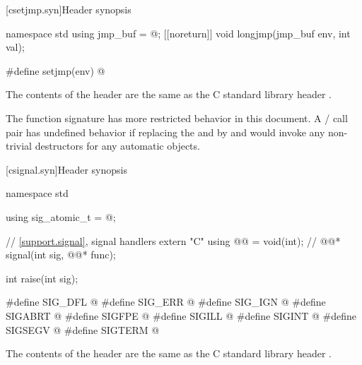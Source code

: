 
[csetjmp.syn]{Header  synopsis}

%
%
%
%
\begin{codeblock}
namespace std {
  using jmp_buf = @\seebelow@;
  [[noreturn]] void longjmp(jmp_buf env, int val);
}

#define setjmp(env) @\seebelow@
\end{codeblock}

\pnum
{}%
The contents of the header  are the same as the C
standard library header .

\pnum
The function signature
%
has more restricted behavior in this document.
A / call pair has undefined
behavior if replacing the  and 
by  and  would invoke any non-trivial destructors for any automatic
objects.


[csignal.syn]{Header  synopsis}

%
%
%
%
%
%
%
%
%
%
%
%
%
\begin{codeblock}
namespace std {
  using sig_atomic_t = @\seebelow@;

  // \ref{support.signal}, signal handlers
  extern "C" using @@ = void(int);  // \expos
  @@* signal(int sig, @@* func);

  int raise(int sig);
}

#define SIG_DFL @\seebelow@
#define SIG_ERR @\seebelow@
#define SIG_IGN @\seebelow@
#define SIGABRT @\seebelow@
#define SIGFPE @\seebelow@
#define SIGILL @\seebelow@
#define SIGINT @\seebelow@
#define SIGSEGV @\seebelow@
#define SIGTERM @\seebelow@
\end{codeblock}

\pnum
{}%
The contents of the header  are the same as the C
standard library header .

